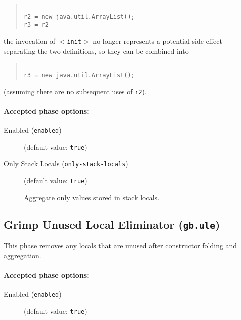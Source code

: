 \documentclass{article}
\begin{document}
\begin{quote}\begin{verbatim}

r2 = new java.util.ArrayList();
r3 = r2

\end{verbatim}\end{quote}
the invocation of {\tt \ensuremath{<}init\ensuremath{>}} no longer represents a potential side-effect 
separating the two definitions, so they can be combined into

\begin{quote}\begin{verbatim}

r3 = new java.util.ArrayList();

\end{verbatim}\end{quote}
(assuming there are no subsequent uses of {\tt r2}).


\paragraph{Accepted phase options:} 

\begin{description}

\item[Enabled ({\tt enabled})]
(default value: {\tt true})






\item[Only Stack Locals ({\tt only-stack-locals})]
(default value: {\tt true})




Aggregate only values stored in stack locals.



\end{description}

\subsection{Grimp Unused Local Eliminator ({\tt gb.ule})}

This phase removes any locals that are unused after constructor
folding and aggregation.


\paragraph{Accepted phase options:} 

\begin{description}

\item[Enabled ({\tt enabled})]
(default value: {\tt true})






\end{description}
\end{document}
